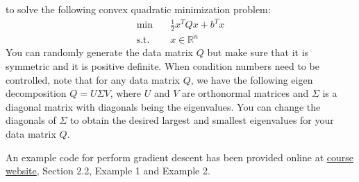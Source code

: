 \documentclass[11pt,letterpaper]{article}
\begin{document}
	to solve the following convex quadratic minimization problem:
	\begin{align}
	\min&\quad \frac{1}{2}x^T Q x + b^T x\nonumber\\
	\mbox{s.t.}&\quad  x\in\mathbb{R}^n
	\end{align}
	You can randomly generate the data matrix $Q$ but make sure that it is symmetric and it is positive definite.  When condition numbers need to be controlled, note that for any data matrix $Q$, we have the following eigen decomposition $Q= U \Sigma V$, where $U$ and $V$ are orthonormal  matrices and $\Sigma$ is a diagonal matrix with diagonals being the eigenvalues. You can change the diagonals of $\Sigma$ to obtain the desired largest and smallest eigenvalues for your data matrix $Q$. 

	An example code for perform gradient descent has been provided online at \href{https://optimai-lab.github.io/LLM-OPT/lectures/Chapter2/gradient.html}{course website}, Section 2.2, Example 1 and Example 2. 
\end{document}
